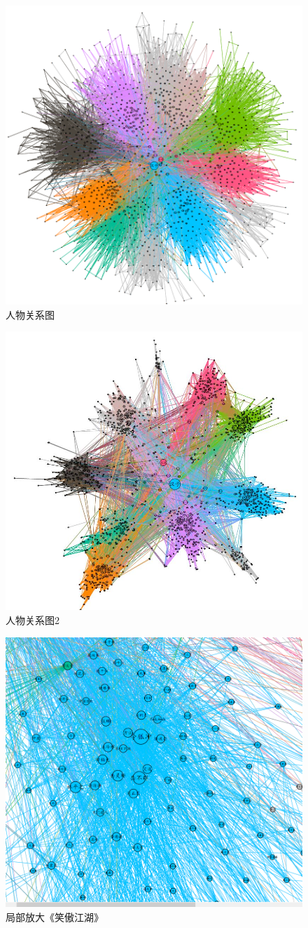 \documentclass{ctexart}
\begin{document}
	\begin{figure}[H]
		\centering
		\includegraphics[width=0.65\linewidth]{pic/visible/Pic1}
		\caption{人物关系图}
		\label{graphCircle}
	\end{figure}
		\begin{figure}[H]
		\centering
		\includegraphics[width=0.65\linewidth]{pic/visible/another}
		\caption{人物关系图2}
		\label{graphCircle2}
	\end{figure}
	\begin{figure}[H]
		\centering
		\includegraphics[width=0.7\linewidth]{pic/visible/Pic2}
		\caption{局部放大《笑傲江湖》}
		\label{graphLocal}
	\end{figure}
	
\end{document}
